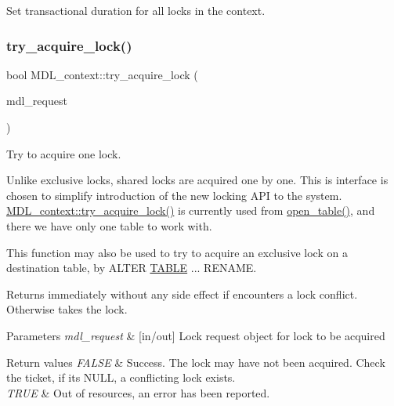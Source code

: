 Set transactional duration for all locks in the context. \mbox{\label{classMDL__context_ab6d07a861aaf9db6fda46da196a8b0d0}} 
\subsubsection{\texorpdfstring{try\+\_\+acquire\+\_\+lock()}{try\_acquire\_lock()}}
{\footnotesize\ttfamily bool M\+D\+L\+\_\+context\+::try\+\_\+acquire\+\_\+lock (\begin{DoxyParamCaption}\item[{\mbox{\hyperlink{classMDL__request}{M\+D\+L\+\_\+request}} $\ast$}]{mdl\+\_\+request }\end{DoxyParamCaption})}

Try to acquire one lock.

Unlike exclusive locks, shared locks are acquired one by one. This is interface is chosen to simplify introduction of the new locking A\+PI to the system. \mbox{\hyperlink{classMDL__context_ab6d07a861aaf9db6fda46da196a8b0d0}{M\+D\+L\+\_\+context\+::try\+\_\+acquire\+\_\+lock()}} is currently used from \mbox{\hyperlink{group__Data__Dictionary_ga43cb5a9ba1064a36db89ad5c4d645528}{open\+\_\+table()}}, and there we have only one table to work with.

This function may also be used to try to acquire an exclusive lock on a destination table, by A\+L\+T\+ER \mbox{\hyperlink{structTABLE}{T\+A\+B\+LE}} ... R\+E\+N\+A\+ME.

Returns immediately without any side effect if encounters a lock conflict. Otherwise takes the lock.


\begin{DoxyParams}{Parameters}
{\em mdl\+\_\+request} & \mbox{[}in/out\mbox{]} Lock request object for lock to be acquired\\
\hline
\end{DoxyParams}

\begin{DoxyRetVals}{Return values}
{\em F\+A\+L\+SE} & Success. The lock may have not been acquired. Check the ticket, if it\textquotesingle{}s N\+U\+LL, a conflicting lock exists. \\
\hline
{\em T\+R\+UE} & Out of resources, an error has been reported. \\
\hline
\end{DoxyRetVals}
\mbox{\label{classMDL__context_a2a7108b456e7c5ee715ee6511c03d542}} 
